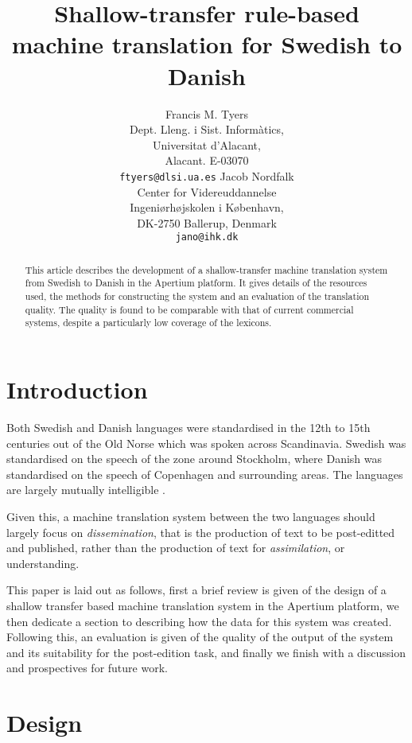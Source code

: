\documentclass[11pt]{article}
\title{Shallow-transfer rule-based machine translation for Swedish to Danish}
\author{Francis M. Tyers\\
  Dept. Lleng. i Sist. Informàtics, \\
  Universitat d'Alacant,\\
  Alacant. E-03070\\  
  {\tt ftyers@dlsi.ua.es} \And
  Jacob Nordfalk\\
  Center for Videreuddannelse\\
  Ingeniørhøjskolen i København,\\
  DK-2750 Ballerup, Denmark\\
  {\tt jano@ihk.dk}}
\date{}
\begin{document}
\maketitle

\begin{abstract}
  This article describes the development of a shallow-transfer machine translation
  system from Swedish to Danish in the Apertium platform. It gives details of the 
  resources used, the methods for constructing the system and an evaluation of the 
  translation quality. The quality is found to be comparable with that of current
  commercial systems, despite a particularly low coverage of the lexicons.
\end{abstract}

\section{Introduction}

Both Swedish and Danish languages were standardised in the 12th to 15th centuries out
of the Old Norse which was spoken across Scandinavia. Swedish was standardised on the 
speech of the zone around Stockholm, where Danish was standardised on the speech of 
Copenhagen and surrounding areas. The languages are largely mutually intelligible \citep{Haugen1990}.

Given this, a machine translation system between the two languages should largely
focus on \emph{dissemination}, that is the production of text to be post-editted and 
published, rather than the production of text for \emph{assimilation}, or understanding.

This paper is laid out as follows, first a brief review is given of the design of a 
shallow transfer based machine translation system in the Apertium platform, we then 
dedicate a section to describing how the data for this system was created. Following this, 
an evaluation is given of the quality of the output of the system and its suitability 
for the post-edition task, and finally we finish with a discussion and prospectives 
for future work.


\section{Design}
\end{document}
